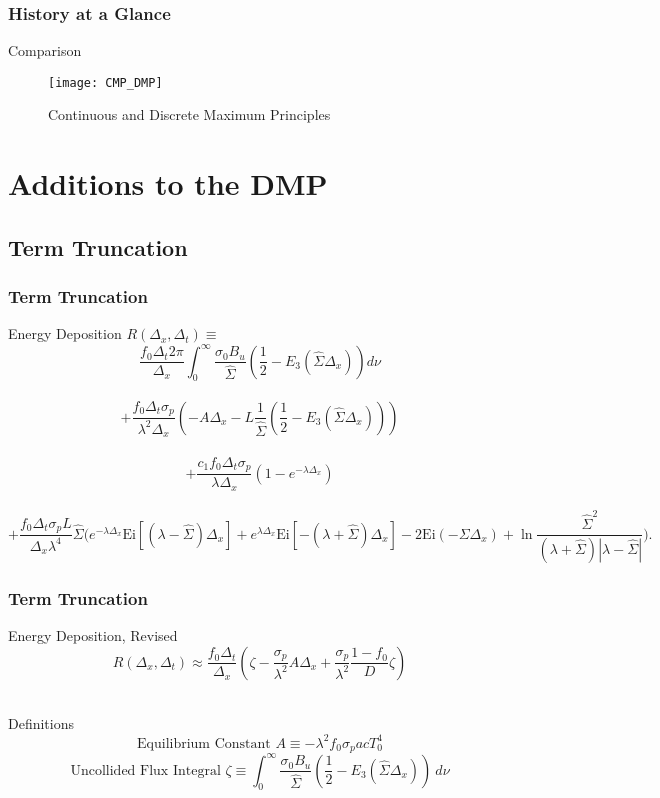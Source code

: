 \documentclass{beamer}
\begin{document}
\begin{frame}\frametitle{History at a Glance}
\begin{block}{Comparison}
\begin{figure}
\texttt{[image: CMP\_DMP]}
\caption{Continuous and Discrete Maximum Principles}
\end{figure}
\end{block}
\end{frame}


\section{Additions to the DMP}
\subsection{Term Truncation}
\begin{frame}\frametitle{Term Truncation}
\begin{exampleblock}{Energy Deposition}
$R(\Delta_x,\Delta_t)\equiv$
\[\frac{f_0\Delta_t2\pi}{\Delta_x}
  \int_0^\infty\frac{\sigma_0B_u}{\hat\Sigma}\left(\frac{1}{2}-
    E_3(\hat\Sigma\Delta_x)\right)d\nu \] \\
  \[+\frac{f_0\Delta_t\sigma_p}{\lambda^2\Delta_x}
    \left(-A\Delta_x-L\frac{1}{\hat\Sigma}\left(\frac{1}{2}
    -E_3(\hat\Sigma\Delta_x)\right)\right) \] \\
  \[+\frac{c_1f_0\Delta_t\sigma_p}{\lambda\Delta_x}
    (1-e^{-\lambda\Delta_x}) \] \\ \tiny
  \[+\frac{f_0\Delta_t\sigma_pL}{\Delta_x\lambda^4}\hat\Sigma
    \bigg(e^{-\lambda\Delta_x}\mbox{Ei}[(\lambda-\hat\Sigma)\Delta_x] +
    e^{\lambda\Delta_x}\mbox{Ei}[-(\lambda+\hat\Sigma)\Delta_x]
    -2\mbox{Ei}(-\Sigma \Delta_x)+
    \ln\frac{\hat\Sigma^2}{(\lambda+\hat\Sigma)|\lambda-\hat\Sigma|} \bigg).\]
\end{exampleblock}
\end{frame}
\begin{frame}\frametitle{Term Truncation}
\begin{exampleblock}{Energy Deposition, Revised}
\[R(\Delta_x,\Delta_t)\approx
\frac{f_0\Delta_t}{\Delta_x}\left(
  \zeta - \frac{\sigma_p}{\lambda^2} A\Delta_x
  + \frac{\sigma_p}{\lambda^2}\frac{1-f_0}{D}\zeta\right) \] \\
\end{exampleblock}
\begin{block}{Definitions}
\[\mbox{Equilibrium Constant } A\equiv-\lambda^2f_0\sigma_pacT_0^4\]
\[\mbox{Uncollided Flux Integral } \zeta\equiv\int_0^\infty \frac{\sigma_0
B_u}{\hat\Sigma}
  \left( \frac{1}{2}-E_3(\hat\Sigma\Delta_x)\right)\ d\nu \]
\end{block}
\end{frame}
\end{document}
